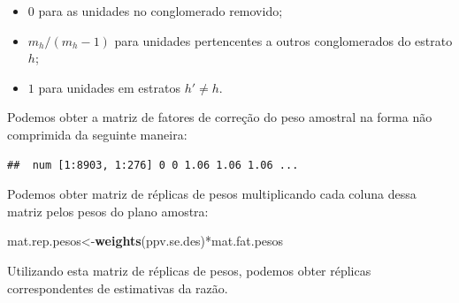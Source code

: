 \documentclass[]{book}
\newenvironment{Shaded}{\begin{snugshade}}{\end{snugshade}}
\newcommand{\KeywordTok}[1]{\textcolor[rgb]{0.13,0.29,0.53}{\textbf{{#1}}}}
\newcommand{\DecValTok}[1]{\textcolor[rgb]{0.00,0.00,0.81}{{#1}}}
\newcommand{\StringTok}[1]{\textcolor[rgb]{0.31,0.60,0.02}{{#1}}}
\newcommand{\NormalTok}[1]{{#1}}
\providecommand{\tightlist}{%
  \setlength{\itemsep}{0pt}\setlength{\parskip}{0pt}}
\numberwithin{example}{chapter}
\numberwithin{remark}{chapter}
\numberwithin{definition}{chapter}
\begin{document}
\begin{itemize}
\tightlist
\item
  \(0\) para as unidades no conglomerado removido;
\item
  \(m_h/(m_h-1)\) para unidades pertencentes a outros conglomerados do
  estrato \(h\);
\item
  \(1\) para unidades em estratos \(h'\neq h\).
\end{itemize}

Podemos obter a matriz de fatores de correção do peso amostral na forma
não comprimida da seguinte maneira:

\begin{Shaded}
\end{Shaded}

\begin{verbatim}
##  num [1:8903, 1:276] 0 0 1.06 1.06 1.06 ...
\end{verbatim}

Podemos obter matriz de réplicas de pesos multiplicando cada coluna
dessa matriz pelos pesos do plano amostra:

\begin{Shaded}
\begin{Highlighting}[]
\NormalTok{mat.rep.pesos<-}\KeywordTok{weights}\NormalTok{(ppv.se.des)*mat.fat.pesos}
\end{Highlighting}
\end{Shaded}

Utilizando esta matriz de réplicas de pesos, podemos obter réplicas
correspondentes de estimativas da razão.

\begin{Shaded}
\end{Shaded}
\end{document}
